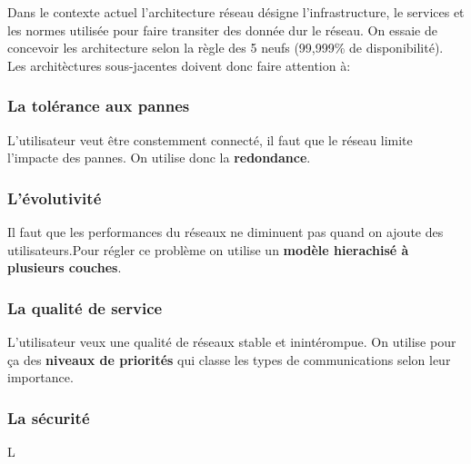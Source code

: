 \documentclass[10pt,a4paper]{article}
\begin{document}
 \indent
 Dans le contexte actuel l'architecture réseau désigne l'infrastructure, le services et les normes utilisée pour faire transiter des donnée dur le réseau. On essaie de concevoir les architecture selon la règle des 5 neufs (99,999\% de disponibilité). Les architèctures sous-jacentes doivent donc faire attention à:

 \subsubsection{La tolérance aux pannes}
 L'utilisateur veut être constemment connecté, il faut que le réseau limite l'impacte des pannes. On utilise donc la \textbf{redondance}.

 \subsubsection{L'évolutivité}
 Il faut que les performances du réseaux ne diminuent pas quand on ajoute des utilisateurs.Pour régler ce problème on utilise un \textbf{modèle hierachisé à plusieurs couches}.

 \subsubsection{La qualité de service}
 L'utilisateur veux une qualité de réseaux stable et inintérompue. On utilise pour ça des \textbf{niveaux de priorités} qui classe les types de communications selon leur importance.

 \subsubsection{La sécurité}
 L

 
\end{document}
